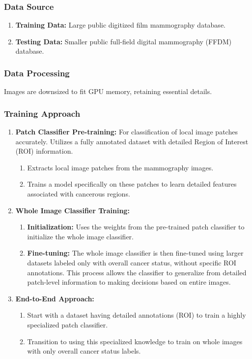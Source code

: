 \documentclass[12]{article}
\begin{document}
\subsubsection{Data Source}

\begin{enumerate}
    \item \textbf{Training Data:} Large public digitized film mammography database.
    \item \textbf{Testing Data:} Smaller public full-field digital mammography (FFDM) database.
\end{enumerate}

\subsubsection{Data Processing}

Images are downsized to fit GPU memory, retaining essential details.

\subsubsection{Training Approach}

\begin{enumerate}
    \item \textbf{Patch Classifier Pre-training:} For classification of local image patches accurately. Utilizes a fully annotated dataset with detailed Region of Interest (ROI) information.
    \begin{enumerate}
        \item Extracts local image patches from the mammography images.
        \item Trains a model specifically on these patches to learn detailed features associated with cancerous regions.
    \end{enumerate}
    \item \textbf{Whole Image Classifier Training:}
    \begin{enumerate}
        \item \textbf{Initialization:} Uses the weights from the pre-trained patch classifier to initialize the whole image classifier.
        \item \textbf{Fine-tuning:} The whole image classifier is then fine-tuned using larger datasets labeled only with overall cancer status, without specific ROI annotations. This process allows the classifier to generalize from detailed patch-level information to making decisions based on entire images.
    \end{enumerate}
    \item \textbf{End-to-End Approach:}
    \begin{enumerate}
        \item Start with a dataset having detailed annotations (ROI) to train a highly specialized patch classifier.
        \item Transition to using this specialized knowledge to train on whole images with only overall cancer status labels.
    \end{enumerate}
\end{enumerate}
\end{document}
